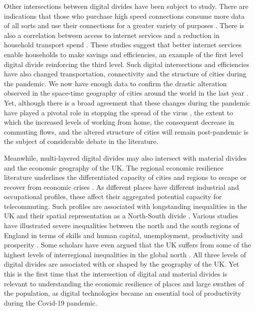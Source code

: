 \documentclass[]{interact}
\theoremstyle{plain}%
\theoremstyle{definition}
\theoremstyle{remark}
\begin{document}
Other intersections between digital divides have been subject to study.
There are indications that those who purchase high speed connections
consume more data of all sorts and use their connections for a greater
variety of purposes \citep{hauge2011consumer}. There is also a
correlation between access to internet services and a reduction in
household transport spend \citep{bris2017ict}. These studies suggest
that better internet services enable households to make savings and
efficiencies, an example of the first level digital divide reinforcing
the third level. Such digital intersections and efficiencies have also
changed transportation, connectivity and the structure of cities during
the pandemic. We now have enough data to confirm the drastic alteration
observed in the space-time geography of cities around the world in the
last year \citep[e.g.][]{google2020, shibayama2021impact}. Yet, although
there is a broad agreement that these changes during the pandemic have
played a pivotal role in stopping the spread of the virus
\citep{jia2020population, yang2020taking, mu2020interplay}, the extent
to which the increased levels of working from home, the consequent
decrease in commuting flows, and the altered structure of cities will
remain post-pandemic is the subject of considerable debate in the
literature.

Meanwhile, multi-layered digital divides may also intersect with
material divides and the economic geography of the UK. The regional
economic resilience literature underlines the differentiated capacity of
cities and regions to escape or recover from economic crises
\citep{martin2012regional, kitsos2018economic}. As different places have
different industrial and occupational profiles, these affect their
aggregated potential capacity for telecommuting. Such profiles are
associated with longstanding inequalities in the UK and their spatial
representation as a North-South divide \citep{martin_north_south}.
Various studies have illustrated severe inequalities between the north
and the south regions of England in terms of skills and human capital,
unemployment, productivity and prosperity
\citep{lee2014grim, mccann2020perceptions, dorling2018peak}. Some
scholars have even argued that the UK suffers from some of the highest
levels of interregional inequalities in the global north
\citep{gal2018reducing, mccann2016uk}. All three levels of digital
divides are associated with or shaped by the geography of the UK. Yet
this is the first time that the intersection of digital and material
divides is relevant to understanding the economic resilience of places
and large swathes of the population, as digital technologies became an
essential tool of productivity during the Covid-19 pandemic.
\end{document}
